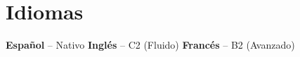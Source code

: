 \section{Idiomas}

\textbf{Español} -- Nativo\dotsep%
\textbf{Inglés} -- C2 (Fluido)\dotsep%
\textbf{Francés} -- B2 (Avanzado)